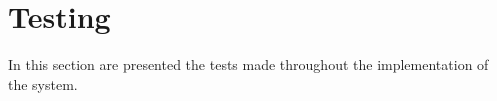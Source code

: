 \chapter{Testing}
\label{cha:testing}

In this section are presented the tests made throughout the implementation of the system.






